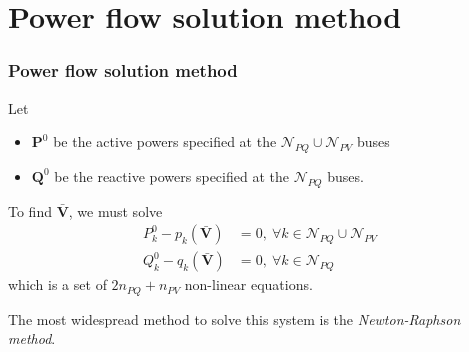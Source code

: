 \section{Power flow solution method}

\begin{frame}
    \frametitle{Power flow solution method}
    Let
    \begin{itemize}
        \item $\mathbf{P}^0$ be the active powers specified at the $\mathcal{N}_{PQ} \cup \mathcal{N}_{PV}$ buses
        \item $\mathbf{Q}^0$ be the reactive powers specified at the $\mathcal{N}_{PQ}$ buses.
    \end{itemize}
    
    To find $\mathbf{\bar{V}}$, we must solve
    \begin{align*}
        P_k^0 - p_k(\mathbf{\bar{V}}) &= 0, \ \forall k \in \mathcal{N}_{PQ} \cup \mathcal{N}_{PV} \\
        Q_k^0 - q_k(\mathbf{\bar{V}}) &= 0, \ \forall k \in \mathcal{N}_{PQ}
    \end{align*}
    which is a set of $2 n_{PQ} + n_{PV}$ non-linear equations.
    
    The most widespread method to solve this system is the \textit{Newton-Raphson method}.
\end{frame}

